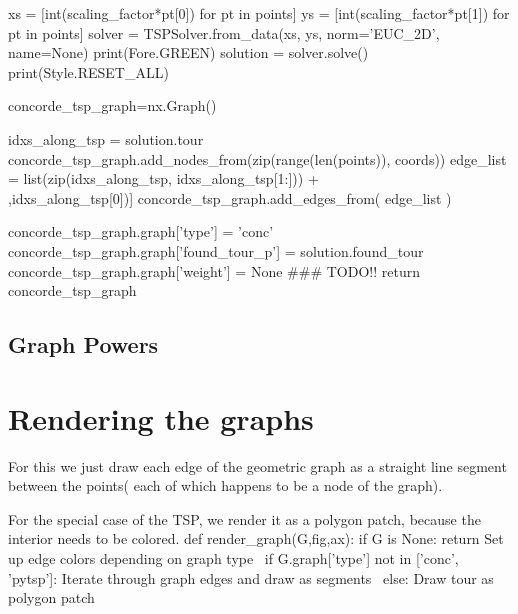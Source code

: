      xs = [int(scaling_factor*pt[0]) for pt in points]
     ys = [int(scaling_factor*pt[1]) for pt in points]
     solver = TSPSolver.from_data(xs, ys, norm='EUC_2D', name=None)
     print(Fore.GREEN)
     solution = solver.solve()
     print(Style.RESET_ALL)

     concorde_tsp_graph=nx.Graph()
          
     idxs_along_tsp = solution.tour
     concorde_tsp_graph.add_nodes_from(zip(range(len(points)), coords))
     edge_list = list(zip(idxs_along_tsp, idxs_along_tsp[1:])) + \\
                    [(idxs_along_tsp[-1],idxs_along_tsp[0])]
     concorde_tsp_graph.add_edges_from(  edge_list  )

     concorde_tsp_graph.graph['type']   = 'conc'
     concorde_tsp_graph.graph['found_tour_p'] = solution.found_tour
     concorde_tsp_graph.graph['weight'] = None ### TODO!! 
     return concorde_tsp_graph
\nwendcode{}\nwdocspar



\subsection{Graph Powers}



\section{Rendering the graphs}

For this we just draw each edge of the geometric graph as a straight line segment 
between the points( each of which happens to be a node of the graph). 

For the special case of the TSP, we render it as a polygon patch, because the interior
needs to be colored. 
\nwenddocs{}\plusendmoddef\nwstartdeflinemarkup{}\nwenddeflinemarkup
def render_graph(G,fig,ax):
     if G is None:
            return
     \LA{}Set up edge colors depending on graph type~{\nwtagstyle{}}\RA{}
     if G.graph['type'] not in ['conc', 'pytsp']:
          \LA{}Iterate through graph edges and draw as segments~{\nwtagstyle{}}\RA{}
     else:
          \LA{}Draw tour as polygon patch~{\nwtagstyle{}}\RA{}
          
